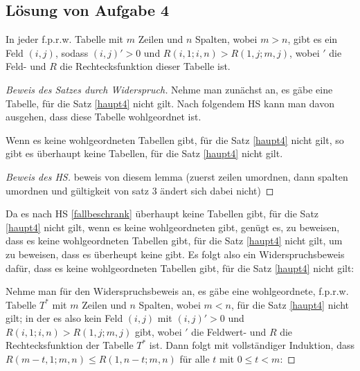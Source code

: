 \subsection*{Lösung von Aufgabe 4}

\begin{thm}\label{haupt4}
    In jeder f.p.r.w. Tabelle mit $m$ Zeilen und $n$ Spalten, wobei $m>n$, gibt es ein Feld $(i, j)$, sodass 
    $(i, j)'>0$ und $R(i, 1; i, n) > R(1, j; m, j)$, wobei $'$ die Feld- und $R$ die Rechtecksfunktion dieser 
    Tabelle ist.
\end{thm}

\begin{proof}[Beweis des Satzes durch Widerspruch]
    Nehme man zunächst an, es gäbe eine Tabelle, für die Satz \ref{haupt4} nicht gilt. Nach folgendem HS kann man 
    davon ausgehen, dass diese Tabelle wohlgeordnet ist.
    \begin{lem}\label{fallbeschrank}
        Wenn es keine wohlgeordneten Tabellen gibt, für die Satz \ref{haupt4} nicht gilt, so gibt es überhaupt keine 
        Tabellen, für die Satz \ref{haupt4} nicht gilt.
    \end{lem}
    \begin{proof}[Beweis des HS]
        beweis von diesem lemma (zuerst zeilen umordnen, dann spalten umordnen und gültigkeit von satz 3 ändert sich 
        dabei nicht) %
    \end{proof}
    Da es nach HS \ref{fallbeschrank} überhaupt keine Tabellen gibt, für die Satz \ref{haupt4} 
    nicht gilt, wenn es keine wohlgeordneten gibt, genügt es, zu beweisen, dass es keine wohlgeordneten Tabellen 
    gibt, für die Satz \ref{haupt4} nicht gilt, um zu beweisen, dass es überheupt keine gibt. Es folgt also ein 
    Widerspruchsbeweis dafür, dass es keine wohlgeordneten Tabellen gibt, für die Satz \ref{haupt4} nicht gilt:

    Nehme man für den Widerspruchsbeweis an, es gäbe eine wohlgeordnete, f.p.r.w. Tabelle $T^*$ mit $m$ Zeilen und $n$ 
    Spalten, wobei $m<n$, für die Satz \ref{haupt4} nicht gilt; in der es also kein Feld $(i, j)$ mit $(i, j)'>0$ 
    und $R(i, 1; i, n)>R(1, j; m, j)$ gibt, wobei $'$ die Feldwert- und $R$ die Rechtecksfunktion der Tabelle $T^*$ 
    ist. Dann folgt mit vollständiger Induktion, dass $R(m-t, 1; m, n)\leq R(1, n-t; m, n)$ für alle $t$ mit $0\leq 
    t<m$:


\end{proof}
